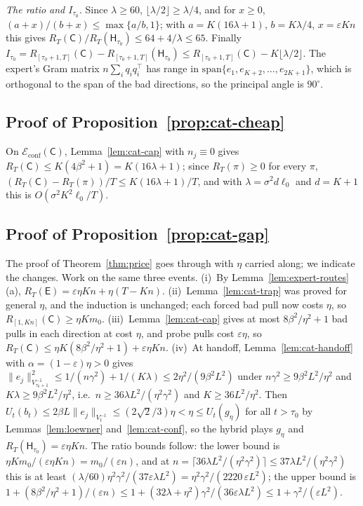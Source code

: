 \documentclass[anon]{alt2027} %
\providecommand{\qed}{\hfill\jmlrBlackBox}
\newcommand{\eps}{\varepsilon}
\newcommand{\Cold}{\mathsf{C}}
\newcommand{\Exp}{\mathsf{E}}
\newcommand{\Hyb}{\mathsf{H}}
\begin{document}
\emph{The ratio and $I_{\tau_0}$.} Since $\lambda\ge60$, $\lfloor\lambda/2\rfloor\ge\lambda/4$,
and for $x\ge0$, $(a+x)/(b+x)\le\max\{a/b,1\}$; with $a=K(16\lambda+1)$,
$b=K\lambda/4$, $x=\eps Kn$ this gives $R_T(\Cold)/R_T(\Hyb_{\tau_0})\le64+4/\lambda\le65$.
Finally $I_{\tau_0}=R_{[\tau_0+1,T]}(\Cold)-R_{[\tau_0+1,T]}(\Hyb_{\tau_0})\le R_{[\tau_0+1,T]}(\Cold)-K\lfloor\lambda/2\rfloor$.
The expert's Gram matrix $n\sum_iq_iq_i^\top$ has range in
$\mathrm{span}\{e_1,e_{K+2},\dots,e_{2K+1}\}$, which is orthogonal to the span of
the bad directions, so the principal angle is $90^\circ$. \qed

\subsection{Proof of Proposition~\ref{prop:cat-cheap}}

On $\mathcal E_{\mathrm{conf}}(\Cold)$, Lemma~\ref{lem:cat-cap} with $n_j\equiv0$
gives $R_T(\Cold)\le K(4\beta^2+1)=K(16\lambda+1)$; since $R_T(\pi)\ge0$ for every
$\pi$, $(R_T(\Cold)-R_T(\pi))/T\le K(16\lambda+1)/T$, and with $\lambda=\sigma^2d\ell_0$
and $d=K+1$ this is $O(\sigma^2K^2\ell_0/T)$. \qed

\subsection{Proof of Proposition~\ref{prop:cat-gap}}

The proof of Theorem~\ref{thm:price} goes through with $\eta$ carried along;
we indicate the changes. Work on the same three events. (i)~By
Lemma~\ref{lem:expert-routes}(a), $R_T(\Exp)=\eps\eta Kn+\eta(T-Kn)$.
(ii)~Lemma~\ref{lem:cat-trap} was proved for general $\eta$, and the induction
is unchanged; each forced bad pull now costs $\eta$, so
$R_{[1,Kn]}(\Cold)\ge\eta Km_0$. (iii)~Lemma~\ref{lem:cat-cap} gives at most
$8\beta^2/\eta^2+1$ bad pulls in each direction at cost $\eta$, and probe pulls
cost $\eps\eta$, so $R_T(\Cold)\le\eta K(8\beta^2/\eta^2+1)+\eps\eta Kn$.
(iv)~At handoff, Lemma~\ref{lem:cat-handoff} with $\alpha=(1-\eps)\eta>0$ gives
$\|e_j\|^2_{V_{\tau_0+1}^{-1}}\le1/(n\gamma^2)+1/(K\lambda)\le2\eta^2/(9\beta^2L^2)$ under
$n\gamma^2\ge9\beta^2L^2/\eta^2$ and $K\lambda\ge9\beta^2L^2/\eta^2$, i.e.\ $n\ge36\lambda L^2/(\eta^2\gamma^2)$
and $K\ge36L^2/\eta^2$. Then $U_t(b_t)\le2\beta L\|e_j\|_{V_t^{-1}}\le(2\sqrt2/3)\eta<\eta\le U_t(g_\eta)$
for all $t>\tau_0$ by Lemmas~\ref{lem:loewner} and~\ref{lem:cat-conf}, so the
hybrid plays $g_\eta$ and $R_T(\Hyb_{\tau_0})=\eps\eta Kn$. The ratio bounds
follow: the lower bound is $\eta Km_0/(\eps\eta Kn)=m_0/(\eps n)$, and at
$n=\lceil36\lambda L^2/(\eta^2\gamma^2)\rceil\le37\lambda L^2/(\eta^2\gamma^2)$ this is at least
$(\lambda/60)\eta^2\gamma^2/(37\eps\lambda L^2)=\eta^2\gamma^2/(2220\,\eps L^2)$; the upper bound
is $1+(8\beta^2/\eta^2+1)/(\eps n)\le1+(32\lambda+\eta^2)\gamma^2/(36\eps\lambda L^2)\le1+\gamma^2/(\eps L^2)$. \qed
\end{document}
